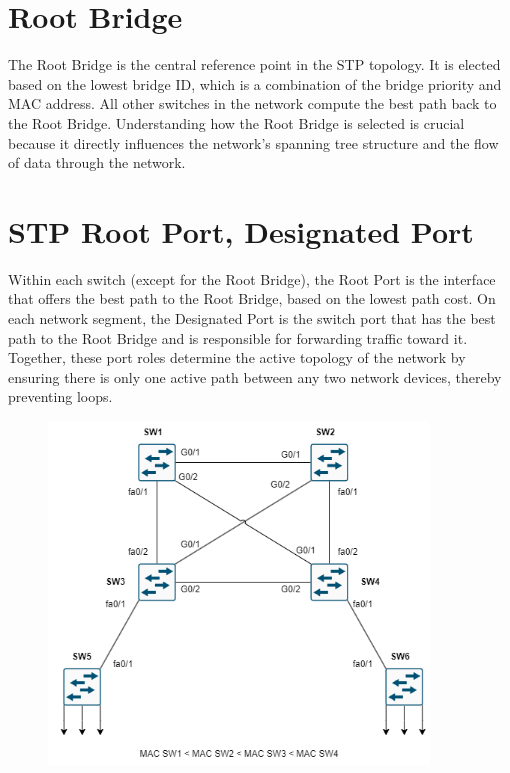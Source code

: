 \documentclass[a4paper]{book}
\begin{document}
\section*{Root Bridge}
The Root Bridge is the central reference point in the STP topology. It is elected based on the lowest bridge ID, which is a combination of the bridge priority and MAC address. All other switches in the network compute the best path back to the Root Bridge. Understanding how the Root Bridge is selected is crucial because it directly influences the network's spanning tree structure and the flow of data through the network.

\section*{STP Root Port, Designated Port}
Within each switch (except for the Root Bridge), the Root Port is the interface that offers the best path to the Root Bridge, based on the lowest path cost. On each network segment, the Designated Port is the switch port that has the best path to the Root Bridge and is responsible for forwarding traffic toward it. Together, these port roles determine the active topology of the network by ensuring there is only one active path between any two network devices, thereby preventing loops.


\begin{figure}[h]
	\centering
	\includegraphics[width=0.9\textwidth]{img/stp01.png}
	\caption{\textit{}}
\end{figure}
\end{document}
